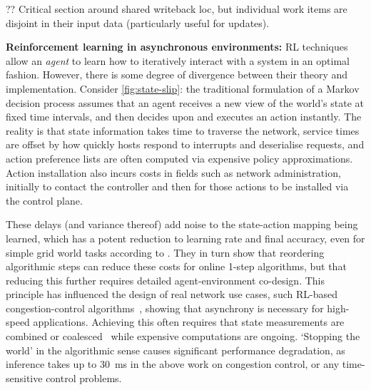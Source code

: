 \documentclass[sigconf,natbib=false]{acmart}
\newcommand{\fakepara}[1]{\noindent\textbf{#1:}}
\begin{document}
?? Critical section around shared writeback loc, but individual work items are disjoint in their input data (particularly useful for updates).

\fakepara{Reinforcement learning in asynchronous environments}
RL techniques allow an \emph{agent} to learn how to iteratively interact with a system in an optimal fashion.
However, there is some degree of divergence between their theory and implementation.
Consider \cref{fig:state-slip}: the traditional formulation of a Markov decision process assumes that an agent receives a new view of the world's state at fixed time intervals, and then decides upon and executes an action instantly.
The reality is that state information takes time to traverse the network, service times are offset by how quickly hosts respond to interrupts and deserialise requests, and action preference lists are often computed via expensive policy approximations.
Action installation also incurs costs in fields such as network administration, initially to contact the controller and then for those actions to be installed via the control plane.

These delays (and variance thereof) add noise to the state-action mapping being learned, which has a potent reduction to learning rate and final accuracy, even for simple grid world tasks according to \textcite{DBLP:journals/firai/TravnikMSP18}.
They in turn show that reordering algorithmic steps can reduce these costs for online 1-step algorithms, but that reducing this further requires detailed agent-environment co-design.
This principle has influenced the design of real network use cases, such RL-based congestion-control algorithms~\parencite{DBLP:journals/corr/abs-1910-04054}, showing that asynchrony is necessary for high-speed applications.
Achieving this often requires that state measurements are combined or coalesced~\parencite{DBLP:journals/corr/abs-1910-04054,DBLP:journals/tnsm/SimpsonRP20} while expensive computations are ongoing.
`Stopping the world' in the algorithmic sense causes significant performance degradation, as inference takes up to \SI{30}{\milli\second} in the above work on congestion control, or any time-sensitive control problems.
\end{document}
